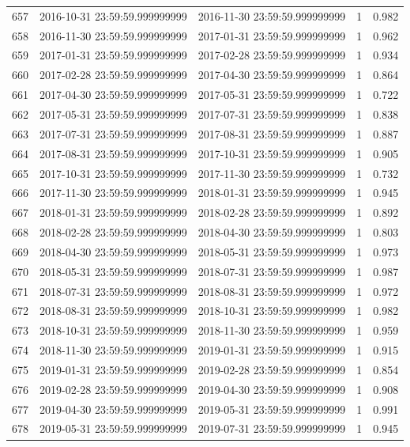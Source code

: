 \begin{table}
\begin{tabular}{lcccc}
657 & 2016-10-31 23:59:59.999999999 & 2016-11-30 23:59:59.999999999 & 1 & 0.982 \\
658 & 2016-11-30 23:59:59.999999999 & 2017-01-31 23:59:59.999999999 & 1 & 0.962 \\
659 & 2017-01-31 23:59:59.999999999 & 2017-02-28 23:59:59.999999999 & 1 & 0.934 \\
660 & 2017-02-28 23:59:59.999999999 & 2017-04-30 23:59:59.999999999 & 1 & 0.864 \\
661 & 2017-04-30 23:59:59.999999999 & 2017-05-31 23:59:59.999999999 & 1 & 0.722 \\
662 & 2017-05-31 23:59:59.999999999 & 2017-07-31 23:59:59.999999999 & 1 & 0.838 \\
663 & 2017-07-31 23:59:59.999999999 & 2017-08-31 23:59:59.999999999 & 1 & 0.887 \\
664 & 2017-08-31 23:59:59.999999999 & 2017-10-31 23:59:59.999999999 & 1 & 0.905 \\
665 & 2017-10-31 23:59:59.999999999 & 2017-11-30 23:59:59.999999999 & 1 & 0.732 \\
666 & 2017-11-30 23:59:59.999999999 & 2018-01-31 23:59:59.999999999 & 1 & 0.945 \\
667 & 2018-01-31 23:59:59.999999999 & 2018-02-28 23:59:59.999999999 & 1 & 0.892 \\
668 & 2018-02-28 23:59:59.999999999 & 2018-04-30 23:59:59.999999999 & 1 & 0.803 \\
669 & 2018-04-30 23:59:59.999999999 & 2018-05-31 23:59:59.999999999 & 1 & 0.973 \\
670 & 2018-05-31 23:59:59.999999999 & 2018-07-31 23:59:59.999999999 & 1 & 0.987 \\
671 & 2018-07-31 23:59:59.999999999 & 2018-08-31 23:59:59.999999999 & 1 & 0.972 \\
672 & 2018-08-31 23:59:59.999999999 & 2018-10-31 23:59:59.999999999 & 1 & 0.982 \\
673 & 2018-10-31 23:59:59.999999999 & 2018-11-30 23:59:59.999999999 & 1 & 0.959 \\
674 & 2018-11-30 23:59:59.999999999 & 2019-01-31 23:59:59.999999999 & 1 & 0.915 \\
675 & 2019-01-31 23:59:59.999999999 & 2019-02-28 23:59:59.999999999 & 1 & 0.854 \\
676 & 2019-02-28 23:59:59.999999999 & 2019-04-30 23:59:59.999999999 & 1 & 0.908 \\
677 & 2019-04-30 23:59:59.999999999 & 2019-05-31 23:59:59.999999999 & 1 & 0.991 \\
678 & 2019-05-31 23:59:59.999999999 & 2019-07-31 23:59:59.999999999 & 1 & 0.945 \\

\end{tabular}
\end{table}
